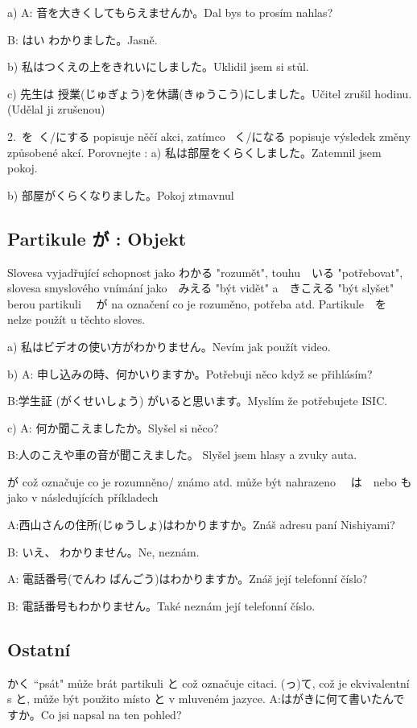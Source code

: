 a)
 A: 音を大きくしてもらえませんか。Dal bys to prosím nahlas?

B: はい わかりました。Jasně.

b) 私はつくえの上をきれいにしました。Uklidil jsem si stůl.


c) 先生は 授業(じゅぎょう)を休講(きゅうこう)にしました。Učitel zrušil hodinu. (Udělal ji zrušenou)



2.~を~く/にする popisuje něčí akci, zatímco  ~く/になる popisuje výsledek změny způsobené akcí.
Porovnejte :
a) 私は部屋をくらくしました。Zatemnil jsem pokoj.

b) 部屋がくらくなりました。Pokoj ztmavnul

\subsection{ Partikule が : Objekt}
Slovesa vyjadřující schopnost jako  わかる "rozumět", touhu　いる "potřebovat", slovesa smyslového vnímání jako　みえる "být vidět" a　きこえる "být slyšet" berou partikuli 　が na označení co je rozuměno, potřeba atd. Partikule　を nelze použít u těchto sloves.


a) 私はビデオの使い方がわかりません。Nevím jak použít video.

b) A: 申し込みの時、何かいりますか。Potřebuji něco když se přihlásím?

B:学生証 (がくせいしょう) がいると思います。Myslím že potřebujete ISIC.

c) A: 何か聞こえましたか。Slyšel si něco?

B:人のこえや車の音が聞こえました。 Slyšel jsem hlasy a zvuky auta.



が což označuje co je rozumněno/ známo atd. může být nahrazeno 　は　nebo も jako v následujících příkladech

A:西山さんの住所(じゅうしょ)はわかりますか。Znáš adresu paní Nishiyami?

B: いえ、 わかりません。Ne, neznám.

A: 電話番号(でんわ ばんごう)はわかりますか。Znáš její telefonní číslo?

B: 電話番号もわかりません。Také neznám její telefonní číslo.


\subsection{Ostatní}
かく “psát" může brát partikuli と což označuje citaci. (っ)て, což je ekvivalentní s  と, může být použito místo  と v mluveném jazyce.
A:はがきに何て書いたんですか。Co jsi napsal na ten pohled?

